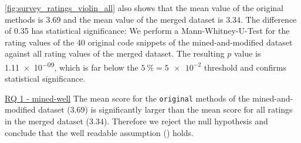 \documentclass[%
class=scrreprt,
chapterprefix=false,%
open=right,%
twoside=true,%
paper=a4,%
logofile={Logo\_zentral\_farbig\_EN.png},%
thesistype=master,%
UKenglish,%
]{se2thesis}
\theoremstyle{definition}
\begin{document}
	\autoref{fig:survey_ratings_violin_all} also shows that the mean value of the original methods is 3.69 and the mean value of the merged dataset is 3.34. The difference of 0.35 has statistical significance:
	We perform a Mann-Whitney-U-Test for the rating values of the 40 original code snippets of the mined-and-modified dataset against all rating values of the merged dataset. The resulting $p$ value is \num{1.11e-09}, which is far below the $5~\%=\num{5e-2}$ threshold and confirms statistical significance.
	

	\begin{summary}{\hyperref[mined-well]{RQ 1 - mined-well}}
		The mean score for the \texttt{original} methods of the mined-and-modified dataset (3.69) is significantly larger than the mean score for all ratings in the merged dataset (3.34). Therefore we reject the null hypothesis and conclude that the well readable assumption () holds.
	\end{summary}
	
\end{document}
